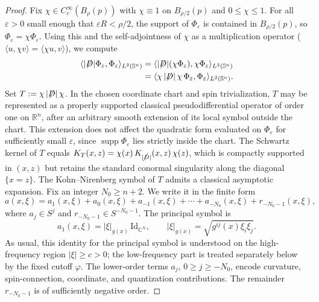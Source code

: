 \documentclass[a4paper, 12pt]{article}
\def\slashiii#1{\setbox0=\hbox{$#1$}#1\hskip-\wd0\hbox to\wd0{\hss\sl/\/\hss}}
\begin{document}
\begin{proof}
	Fix $\chi \in C_c^\infty(B_\rho(p))$ with $\chi \equiv 1$ on
	$B_{\rho/2}(p)$ and $0 \le \chi \le 1$. For all $\varepsilon > 0$ small
	enough that $\varepsilon R < \rho/2$, the support of $\Phi_\varepsilon$ is
	contained in $B_{\rho/2}(p)$, so $\Phi_\varepsilon = \chi\Phi_\varepsilon$.
	Using this and the self-adjointness of $\chi$ as a multiplication operator
	($\langle u,\chi v\rangle = \langle \chi u, v\rangle$), we compute
	\[
	\begin{aligned}
		\langle |\slashiii{D}|\Phi_\varepsilon,\Phi_\varepsilon\rangle_{L^2(\mathbb{S}^n)}
		&= \langle |\slashiii{D}|(\chi\Phi_\varepsilon),\chi\Phi_\varepsilon
		\rangle_{L^2(\mathbb{S}^n)}\\
		&= \langle \chi\,|\slashiii{D}|\,\chi\,\Phi_\varepsilon,\Phi_\varepsilon
		\rangle_{L^2(\mathbb{S}^n)}.
	\end{aligned}
	\]
	Set $T := \chi\,|\slashiii{D}|\,\chi$. In the chosen coordinate chart and spin
	trivialization, $T$ may be represented as a properly supported classical
	pseudodifferential operator of order one on $\mathbb{R}^n$, after an
	arbitrary smooth extension of its local symbol outside the chart. This
	extension does not affect the quadratic form evaluated on $\Phi_\varepsilon$
	for sufficiently small $\varepsilon$, since $\operatorname{supp}\Phi_\varepsilon$
	lies strictly inside the chart. The Schwartz kernel of $T$ equals
	$K_T(x,z) = \chi(x)\,K_{|\slashiii{D}|}(x,z)\,\chi(z)$, which is compactly supported in
	$(x,z)$ but retains the standard conormal singularity along the diagonal
	$\{x = z\}$. The Kohn--Nirenberg symbol of \(T\) admits a classical asymptotic
	expansion. Fix an integer \(N_0\ge n+2\). We write it in the finite form
	\[
	a(x,\xi)
	=
	a_1(x,\xi)+a_0(x,\xi)+a_{-1}(x,\xi)+\cdots+a_{-N_0}(x,\xi)
	+r_{-N_0-1}(x,\xi),
	\]
	where \(a_j\in S^j\) and \(r_{-N_0-1}\in S^{-N_0-1}\). The principal symbol is
	\[
	a_1(x,\xi)=|\xi|_{g(x)}\,\mathrm{Id}_{\mathbb C^N},
	\qquad
	|\xi|_{g(x)}=\sqrt{g^{ij}(x)\xi_i\xi_j}.
	\]
	As usual, this identity for the principal symbol is understood on the
	high-frequency region \(|\xi|\ge c>0\); the low-frequency part is treated
	separately below by the fixed cutoff \(\varphi\). The lower-order terms \(a_j\), \(0\ge j\ge -N_0\), encode curvature,
	spin-connection, coordinate, and quantization contributions. The remainder
	\(r_{-N_0-1}\) is of sufficiently negative order.
	

\end{proof}
\end{document}
